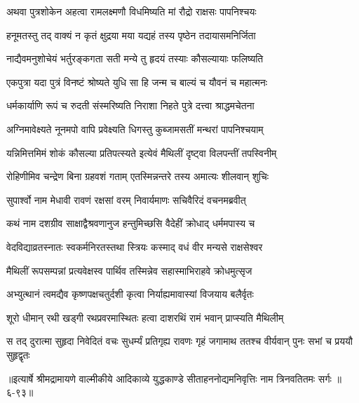 \twolineshloka
{अथवा पुत्रशोकेन अहत्वा रामलक्ष्मणौ}
{विधमिष्यति मां रौद्रो राक्षसः पापनिश्चयः} %

\twolineshloka
{हनूमतस्तु तद् वाक्यं न कृतं क्षुद्रया मया}
{यद्यहं तस्य पृष्ठेन तदायासमनिर्जिता} %

\twolineshloka
{नाद्यैवमनुशोचेयं भर्तुरङ्कगता सती}
{मन्ये तु हृदयं तस्याः कौसल्यायाः फलिष्यति} %

\twolineshloka
{एकपुत्रा यदा पुत्रं विनष्टं श्रोष्यते युधि}
{सा हि जन्म च बाल्यं च यौवनं च महात्मनः} %

\twolineshloka
{धर्मकार्याणि रूपं च रुदती संस्मरिष्यति}
{निराशा निहते पुत्रे दत्त्वा श्राद्धमचेतना} %

\twolineshloka
{अग्निमावेक्ष्यते नूनमपो वापि प्रवेक्ष्यति}
{धिगस्तु कुब्जामसतीं मन्थरां पापनिश्चयाम्} %

\twolineshloka
{यन्निमित्तमिमं शोकं कौसल्या प्रतिपत्स्यते}
{इत्येवं मैथिलीं दृष्ट्वा विलपन्तीं तपस्विनीम्} %

\twolineshloka
{रोहिणीमिव चन्द्रेण बिना ग्रहवशं गताम्}
{एतस्मिन्नन्तरे तस्य अमात्यः शीलवान् शुचिः} %

\twolineshloka
{सुपार्श्वो नाम मेधावी रावणं रक्षसां वरम्}
{निवार्यमाणः सचिवैरिदं वचनमब्रवीत्} %

\twolineshloka
{कथं नाम दशग्रीव साक्षाद्वैश्रवणानुज}
{हन्तुमिच्छसि वैदेहीं क्रोधाद् धर्ममपास्य च} %

\twolineshloka
{वेदविद्याव्रतस्नातः स्वकर्मनिरतस्तथा}
{स्त्रियः कस्माद् वधं वीर मन्यसे राक्षसेश्वर} %

\twolineshloka
{मैथिलीं रूपसम्पन्नां प्रत्यवेक्षस्व पार्थिव}
{तस्मिन्नेव सहास्माभिराहवे क्रोधमुत्सृज} %

\twolineshloka
{अभ्युत्थानं त्वमद्यैव कृष्णपक्षचतुर्दशी}
{कृत्वा निर्याह्यमावास्यां विजयाय बलैर्वृतः} %

\twolineshloka
{शूरो धीमान् रथी खड्गी रथप्रवरमास्थितः}
{हत्वा दाशरथिं रामं भवान् प्राप्स्यति मैथिलीम्} %

\twolineshloka
{स तद् दुरात्मा सुहृदा निवेदितं वचः सुधर्म्यं प्रतिगृह्य रावणः}
{गृहं जगामाथ ततश्च वीर्यवान् पुनः सभां च प्रययौ सुहृद्वृतः} %


॥इत्यार्षे श्रीमद्रामायणे वाल्मीकीये आदिकाव्ये युद्धकाण्डे सीताहननोद्यमनिवृत्तिः नाम त्रिनवतितमः सर्गः ॥६-९३॥
